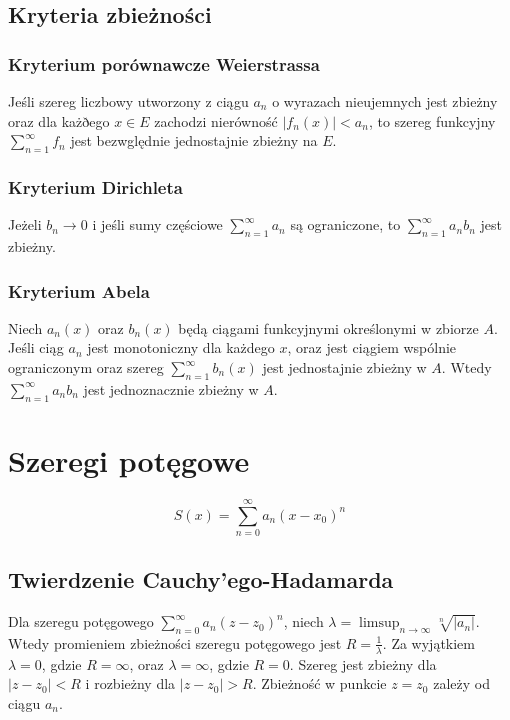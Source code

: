 \documentclass{../notatki}
\begin{document}
\subsection{Kryteria zbieżności}

\subsubsection{Kryterium porównawcze Weierstrassa}

Jeśli szereg liczbowy utworzony z ciągu $a_n$ o wyrazach nieujemnych jest
zbieżny oraz dla każðego $x \in E$ zachodzi nierówność $|f_n(x)| < a_n$, to
szereg funkcyjny $\sum_{n=1}^\infty f_n$ jest bezwględnie jednostajnie
zbieżny na $E$.

\subsubsection{Kryterium Dirichleta}

Jeżeli $b_n \to 0$ i jeśli sumy częściowe $\sum_{n=1}^\infty a_n$ są
ograniczone,
to $\sum_{n=1}^\infty a_n b_n$ jest zbieżny.

\subsubsection{Kryterium Abela}

Niech $a_n(x)$ oraz $b_n(x)$ będą ciągami funkcyjnymi określonymi w zbiorze
$A$. Jeśli ciąg $a_n$ jest monotoniczny dla każdego $x$, oraz jest
ciągiem wspólnie ograniczonym oraz szereg $\sum_{n=1}^\infty b_n(x)$
jest jednostajnie zbieżny w $A$. Wtedy $\sum_{n=1}^{\infty} a_n b_n$ jest
jednoznacznie zbieżny w $A$.

\section{Szeregi potęgowe}

$$
S(x) = \sum_{n=0}^\infty a_n (x - x_0)^n
$$

\subsection{Twierdzenie Cauchy'ego-Hadamarda}

Dla szeregu potęgowego $\sum_{n=0}^\infty a_n (z - z_0)^n$, niech
$\lambda = \limsup_{n \to \infty} \sqrt[n]{|a_n|}$. Wtedy promieniem
zbieżności szeregu potęgowego jest $R = \frac{1}{\lambda}$. Za wyjątkiem
$\lambda = 0$, gdzie $R = \infty$, oraz $\lambda = \infty$, gdzie $R = 0$.
Szereg jest zbieżny dla $|z - z_0| < R$ i rozbieżny dla $|z - z_0| > R$.
Zbieżność w punkcie $z = z_0$ zależy od ciągu $a_n$.
\end{document}
